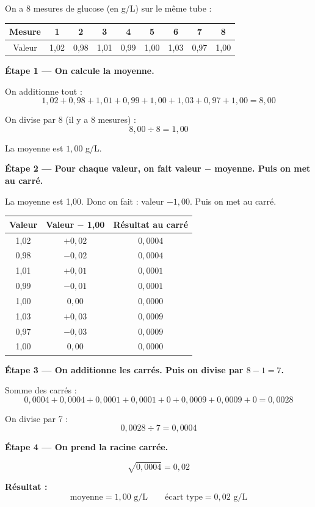 \documentclass[12pt,a4paper]{article}
\begin{document}
\begin{exemple}
On a 8 mesures de glucose (en g/L) sur le même tube :

\begin{center}
\begin{tabular}{|c|c|c|c|c|c|c|c|c|}
\hline
Mesure & 1 & 2 & 3 & 4 & 5 & 6 & 7 & 8 \\
\hline
Valeur & 1,02 & 0,98 & 1,01 & 0,99 & 1,00 & 1,03 & 0,97 & 1,00 \\
\hline
\end{tabular}
\end{center}

\vspace{0.3cm}
\textbf{Étape 1 — On calcule la moyenne.}

On additionne tout :
\[
1{,}02 + 0{,}98 + 1{,}01 + 0{,}99 + 1{,}00 + 1{,}03 + 0{,}97 + 1{,}00 = 8{,}00
\]

On divise par 8 (il y a 8 mesures) :
\[
8{,}00 \div 8 = 1{,}00
\]

La moyenne est $1{,}00$ g/L.

\vspace{0.3cm}
\textbf{Étape 2 — Pour chaque valeur, on fait valeur $-$ moyenne. Puis on met au carré.}

La moyenne est 1,00. Donc on fait : valeur $- 1{,}00$. Puis on met au carré.

\begin{center}
\begin{tabular}{|c|c|c|}
\hline
Valeur & Valeur $-$ 1,00 & Résultat au carré \\
\hline
1,02 & $+0{,}02$ & $0{,}0004$ \\
\hline
0,98 & $-0{,}02$ & $0{,}0004$ \\
\hline
1,01 & $+0{,}01$ & $0{,}0001$ \\
\hline
0,99 & $-0{,}01$ & $0{,}0001$ \\
\hline
1,00 & $0{,}00$ & $0{,}0000$ \\
\hline
1,03 & $+0{,}03$ & $0{,}0009$ \\
\hline
0,97 & $-0{,}03$ & $0{,}0009$ \\
\hline
1,00 & $0{,}00$ & $0{,}0000$ \\
\hline
\end{tabular}
\end{center}

\vspace{0.3cm}
\textbf{Étape 3 — On additionne les carrés. Puis on divise par $8 - 1 = 7$.}

Somme des carrés :
\[
0{,}0004 + 0{,}0004 + 0{,}0001 + 0{,}0001 + 0 + 0{,}0009 + 0{,}0009 + 0 = 0{,}0028
\]

On divise par 7 :
\[
0{,}0028 \div 7 = 0{,}0004
\]

\vspace{0.3cm}
\textbf{Étape 4 — On prend la racine carrée.}

\[
\sqrt{0{,}0004} = 0{,}02
\]

\vspace{0.3cm}
\textbf{Résultat :}
\[
\boxed{\text{moyenne} = 1{,}00 \text{ g/L} \qquad \text{écart type} = 0{,}02 \text{ g/L}}
\]
\end{exemple}
\end{document}
